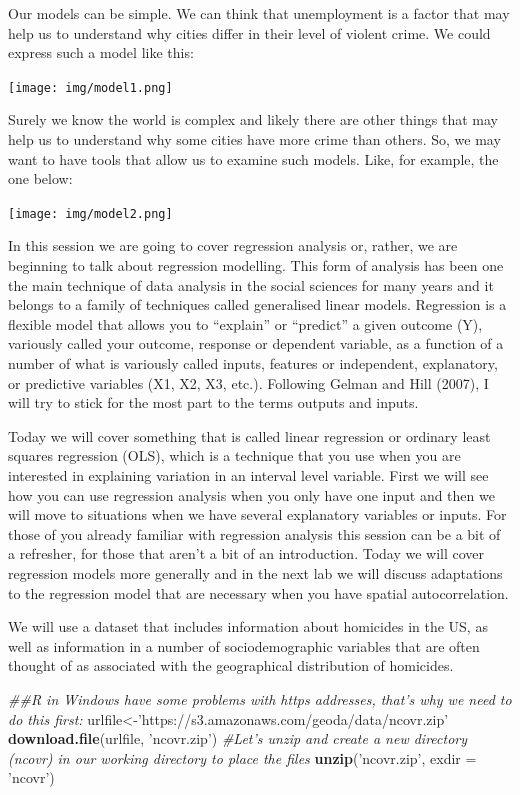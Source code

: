 \documentclass[]{book}
\newenvironment{Shaded}{\begin{snugshade}}{\end{snugshade}}
\newcommand{\CommentTok}[1]{\textcolor[rgb]{0.56,0.35,0.01}{\textit{#1}}}
\newcommand{\DataTypeTok}[1]{\textcolor[rgb]{0.13,0.29,0.53}{#1}}
\newcommand{\KeywordTok}[1]{\textcolor[rgb]{0.13,0.29,0.53}{\textbf{#1}}}
\newcommand{\NormalTok}[1]{#1}
\newcommand{\StringTok}[1]{\textcolor[rgb]{0.31,0.60,0.02}{#1}}
\begin{document}
Our models can be simple. We can think that unemployment is a factor that may help us to understand why cities differ in their level of violent crime. We could express such a model like this:

\texttt{[image: img/model1.png]}

Surely we know the world is complex and likely there are other things that may help us to understand why some cities have more crime than others. So, we may want to have tools that allow us to examine such models. Like, for example, the one below:

\texttt{[image: img/model2.png]}

In this session we are going to cover regression analysis or, rather, we are beginning to talk about regression modelling. This form of analysis has been one the main technique of data analysis in the social sciences for many years and it belongs to a family of techniques called generalised linear models. Regression is a flexible model that allows you to ``explain'' or ``predict'' a given outcome (Y), variously called your outcome, response or dependent variable, as a function of a number of what is variously called inputs, features or independent, explanatory, or predictive variables (X1, X2, X3, etc.). Following Gelman and Hill (2007), I will try to stick for the most part to the terms outputs and inputs.

Today we will cover something that is called linear regression or ordinary least squares regression (OLS), which is a technique that you use when you are interested in explaining variation in an interval level variable. First we will see how you can use regression analysis when you only have one input and then we will move to situations when we have several explanatory variables or inputs. For those of you already familiar with regression analysis this session can be a bit of a refresher, for those that aren't a bit of an introduction. Today we will cover regression models more generally and in the next lab we will discuss adaptations to the regression model that are necessary when you have spatial autocorrelation.

We will use a dataset that includes information about homicides in the US, as well as information in a number of sociodemographic variables that are often thought of as associated with the geographical distribution of homicides.

\begin{Shaded}
\begin{Highlighting}[]
\CommentTok{##R in Windows have some problems with https addresses, that's why we need to do this first:}
\NormalTok{urlfile<-}\StringTok{'https://s3.amazonaws.com/geoda/data/ncovr.zip'}
\KeywordTok{download.file}\NormalTok{(urlfile, }\StringTok{'ncovr.zip'}\NormalTok{)}
\CommentTok{#Let's unzip and create a new directory (ncovr) in our working directory to place the files}
\KeywordTok{unzip}\NormalTok{(}\StringTok{'ncovr.zip'}\NormalTok{, }\DataTypeTok{exdir =} \StringTok{'ncovr'}\NormalTok{)}
\end{Highlighting}
\end{Shaded}
\end{document}
